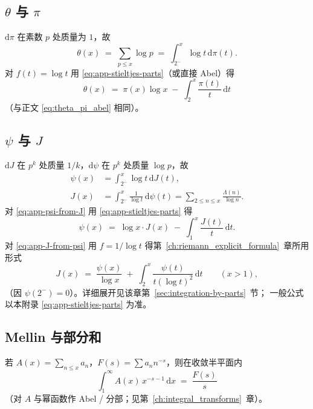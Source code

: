 \subsection{\texorpdfstring{$\theta$}{theta} 与 \texorpdfstring{$\pi$}{pi}}
$\mathrm{d}\pi$ 在素数 $p$ 处质量为 $1$，故
\[
\theta(x)
  \;=\;
  \sum_{p\le x}\log p
  \;=\;
  \int_{2^-}^{x}\log t\,\mathrm{d}\pi(t).
\]
对 $f(t)=\log t$ 用 \eqref{eq:app-stieltjes-parts}（或直接 Abel）得
\begin{equation}
  \theta(x)
  \;=\;
  \pi(x)\log x
  \;-\;
  \int_2^{x}\frac{\pi(t)}{t}\,\mathrm{d}t
  \label{eq:app-theta-pi}
\end{equation}
（与正文 \eqref{eq:theta_pi_abel} 相同）。

\subsection{\texorpdfstring{$\psi$}{psi} 与 \texorpdfstring{$J$}{J}}
$\mathrm{d}J$ 在 $p^k$ 处质量 $1/k$，$\mathrm{d}\psi$ 在 $p^k$ 处质量 $\log p$，故
\begin{align}
\psi(x)
  &=
  \int_{2^-}^{x}\log t\,\mathrm{d}J(t),
  \label{eq:app-psi-from-J}\\
J(x)
  &=
  \int_{2^-}^{x}\frac{1}{\log t}\,\mathrm{d}\psi(t)
  =
  \sum_{2\le n\le x}\frac{\Lambda(n)}{\log n}.
  \label{eq:app-J-from-psi}
\end{align}
对 \eqref{eq:app-psi-from-J} 用 \eqref{eq:app-stieltjes-parts} 得
\begin{equation}
  \psi(x)
  \;=\;
  \log x\cdot J(x)
  \;-\;
  \int_1^{x}\frac{J(t)}{t}\,\mathrm{d}t.
  \label{eq:app-psi-J-parts}
\end{equation}
对 \eqref{eq:app-J-from-psi} 用 $f=1/\log t$ 得第~\ref{ch:riemann_explicit_formula}~章所用形式
\begin{equation}
  J(x)
  \;=\;
  \frac{\psi(x)}{\log x}
  \;+\;
  \int_2^{x}\frac{\psi(t)}{t(\log t)^2}\,\mathrm{d}t
  \qquad (x>1),
  \label{eq:app-J-from-psi-parts}
\end{equation}
（因 $\psi(2^-)=0$）。详细展开见该章第~\ref{sec:integration-by-parts}~节；
一般公式以本附录 \eqref{eq:app-stieltjes-parts} 为准。

\subsection{Mellin 与部分和}
若 $A(x)=\sum_{n\le x}a_n$，$F(s)=\sum a_n n^{-s}$，则在收敛半平面内
\[
\int_1^{\infty} A(x)\,x^{-s-1}\,\mathrm{d}x
  \;=\;
  \frac{F(s)}{s}
\]
（对 $A$ 与幂函数作 Abel / 分部；见第~\ref{ch:integral_transforms}~章）。

